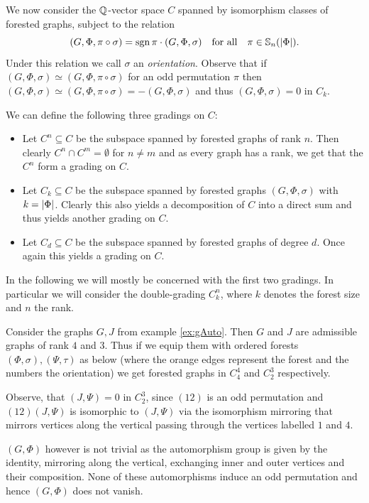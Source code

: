 We now consider the $\mathbb{Q}$-vector space $C$ spanned by isomorphism classes of forested graphs, subject to the relation
\[
	(G,\Phi, \pi \circ \sigma) = \sgn{\pi} \cdot (G,\Phi, \sigma) \qq{for all} \pi \in \mathbb{S}_{n}(\abs{\Phi})
.\]
Under this relation we call $\sigma$ an \emph{orientation}.
Observe that if $(G,\Phi, \sigma) \simeq (G,\Phi, \pi \circ \sigma)$ for an odd permutation $\pi$ then 
$(G,\Phi, \sigma) \simeq (G,\Phi, \pi \circ \sigma) = - (G,\Phi, \sigma)$ and thus $(G,\Phi, \sigma) = 0$ in  $C_{k}$.

We can define the following three gradings on $C$:
 \begin{itemize}
	\item Let $C^{n} \subseteq C$ be the subspace spanned by forested graphs of rank $n$. Then clearly  $C^{n} \cap C^{m} = \emptyset$ for $n \neq m$ and
		as every graph has a rank, we get that the $C^{n}$ form a grading on $C$.
	\item Let $C_{k} \subseteq C$ be the subspace spanned by forested graphs $(G,\Phi,\sigma)$ with $k = \abs{\Phi}$. Clearly this also yields a decomposition of $C$ into a direct sum
		and thus yields another grading on $C$.
	\item Let  $C_{d} \subseteq C$ be the subspace spanned by forested graphs of degree $d$. Once again this yields a grading on $C$.
\end{itemize}
In the following we will mostly be concerned with the first two gradings. In particular we will consider the double-grading $C_{k}^{n}$,
where $k$ denotes the forest size and $n$ the rank. 

\begin{eg}\label{ex:fg}
	Consider the graphs $G, J$ from example \ref{ex:gAuto}. Then $G$ and $J$ are admissible graphs of rank $4$ and $3$. Thus if we equip them with ordered forests 
	$(\Phi,\sigma), (\Psi,\tau)$ as below 
	(where the orange edges represent the forest and the numbers the orientation) we get forested graphs in $C^{4}_{4}$ and $C^{3}_{2}$ respectively.


	Observe, that $(J,\Psi) = 0$ in $C_{2}^{3}$, since $ (1 2)$ is an odd permutation and  $(1 2) (J,\Psi)$ is isomorphic to $(J,\Psi)$ 
	via the isomorphism mirroring that mirrors vertices along the vertical passing through the vertices labelled $1$ and $4$.

	$(G,\Phi)$ however is not trivial as the automorphism group is given by the identity,
	mirroring along the vertical, exchanging inner and outer vertices and their composition.
	None of these automorphisms induce an odd permutation and hence $(G,\Phi)$ does not vanish.
\end{eg}

